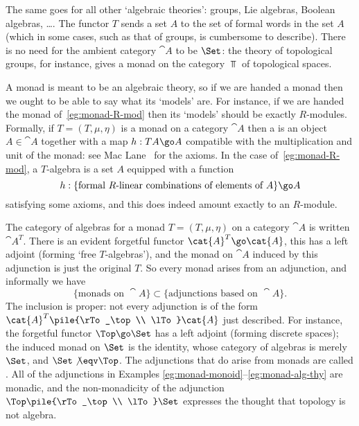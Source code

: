 \begin{example}	
The same goes for all other `algebraic%
%
%
theories': groups, Lie algebras,
Boolean algebras, \ldots.  The functor $T$ sends a set $A$ to the set of
formal words in the set $A$ (which in some cases, such as that of groups,
is cumbersome to describe).  There is no need for the ambient category
$\cat{A}$ to be $\Set$: the theory of topological groups,%
%
%
for instance,
gives a monad on the category $\Top$%
% 
% 
of topological spaces.
\end{example}

A monad is meant to be an algebraic theory, so if we are handed a monad
then we ought to be able to say what its `models' are.  For instance, if we
are handed the monad of~\ref{eg:monad-R-mod} then its `models' should be
exactly $R$-modules.  Formally, if $T = (T, \mu, \eta)$ is a monad on a
category $\cat{A}$ then a %
%
%
is an object $A \in \cat{A}$
together with a map $h: TA \go A$ compatible with the multiplication and
unit of the monad: see Mac Lane~\cite[VI.2]{MacCWM} for the axioms.  In the
case of~\ref{eg:monad-R-mod}, a $T$-algebra is a set $A$ equipped with a
function
\[
h:
\{ \textrm{formal }R \textrm{-linear combinations of elements of }A \}
\go 
A
\]
satisfying some axioms, and this does indeed amount exactly to an
$R$-module.%
%
%

The category of algebras for a monad $T = (T, \mu, \eta)$ on a category
$\cat{A}$ is written $\cat{A}^T$.  There is an evident forgetful functor
$\cat{A}^T \go \cat{A}$, this has a left adjoint (forming `free%
%
%
$T$-algebras'), and the monad on $\cat{A}$ induced by this adjunction is
just the original $T$.  So every monad arises from an adjunction, and
informally we have
\[
\{\textrm{monads on } \cat{A} \}
\subset
\{\textrm{adjunctions based on } \cat{A} \}.
\]
The inclusion is proper: not every adjunction is of the form $\cat{A}^T
\pile{\rTo_\top \\ \lTo} \cat{A}$ just described.  For instance, the
forgetful functor $\Top \go \Set$ has a left adjoint (forming discrete
spaces); the induced monad on $\Set$ is the identity, whose category of
algebras is merely $\Set$, and $\Set \not\eqv \Top$.  The adjunctions that
do arise from monads are called .%
%
%
 All of the adjunctions in
Examples \ref{eg:monad-monoid}--\ref{eg:monad-alg-thy} are monadic, and the
non-monadicity of the adjunction $\Top \pile{\rTo_\top \\ \lTo} \Set$
expresses the thought that topology%
%
%
is not algebra.%
%
%


